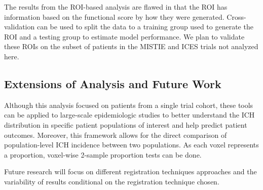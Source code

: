 \documentclass[10pt]{article}\usepackage[]{graphicx}\usepackage[]{color}
\begin{document}
The results from the ROI-based analysis are flawed in that the ROI has information based on the functional score by how they were generated.  Cross-validation can be used to split the data to a training group used to generate the ROI and a testing group to estimate model performance.  We plan to validate these ROIs on the subset of patients in the MISTIE and ICES trials not analyzed here.  

\subsection{Extensions of Analysis and Future Work }
Although this analysis focused on patients from a single trial cohort, these tools can be applied to large-scale epidemiologic studies to better understand the ICH distribution in specific patient populations of interest and help predict patient outcomes.  Moreover, this framework allows for the direct comparison of population-level ICH incidence between two populations.  As each voxel represents a proportion, voxel-wise 2-sample proportion tests can be done.

Future research will focus on different registration techniques approaches and the variability of results conditional on the registration technique chosen. 






\end{document}
